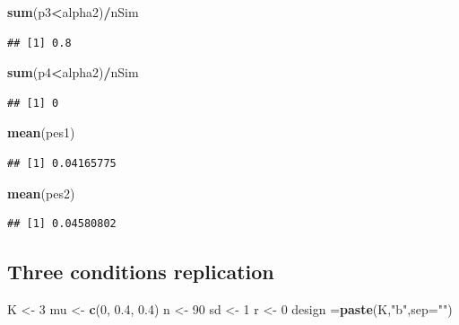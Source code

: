 \documentclass[]{book}
\newenvironment{Shaded}{\begin{snugshade}}{\end{snugshade}}
\newcommand{\DataTypeTok}[1]{\textcolor[rgb]{0.13,0.29,0.53}{#1}}
\newcommand{\DecValTok}[1]{\textcolor[rgb]{0.00,0.00,0.81}{#1}}
\newcommand{\FloatTok}[1]{\textcolor[rgb]{0.00,0.00,0.81}{#1}}
\newcommand{\KeywordTok}[1]{\textcolor[rgb]{0.13,0.29,0.53}{\textbf{#1}}}
\newcommand{\NormalTok}[1]{#1}
\newcommand{\OperatorTok}[1]{\textcolor[rgb]{0.81,0.36,0.00}{\textbf{#1}}}
\newcommand{\StringTok}[1]{\textcolor[rgb]{0.31,0.60,0.02}{#1}}
\begin{document}
\begin{Shaded}
\begin{Highlighting}[]
\KeywordTok{sum}\NormalTok{(p3}\OperatorTok{<}\NormalTok{alpha2)}\OperatorTok{/}\NormalTok{nSim}
\end{Highlighting}
\end{Shaded}

\begin{verbatim}
## [1] 0.8
\end{verbatim}

\begin{Shaded}
\begin{Highlighting}[]
\KeywordTok{sum}\NormalTok{(p4}\OperatorTok{<}\NormalTok{alpha2)}\OperatorTok{/}\NormalTok{nSim}
\end{Highlighting}
\end{Shaded}

\begin{verbatim}
## [1] 0
\end{verbatim}

\begin{Shaded}
\begin{Highlighting}[]
\KeywordTok{mean}\NormalTok{(pes1)}
\end{Highlighting}
\end{Shaded}

\begin{verbatim}
## [1] 0.04165775
\end{verbatim}

\begin{Shaded}
\begin{Highlighting}[]
\KeywordTok{mean}\NormalTok{(pes2)}
\end{Highlighting}
\end{Shaded}

\begin{verbatim}
## [1] 0.04580802
\end{verbatim}

\hypertarget{three-conditions-replication}{%
\subsection{Three conditions replication}\label{three-conditions-replication}}

\begin{Shaded}
\begin{Highlighting}[]
\NormalTok{K <-}\StringTok{ }\DecValTok{3}
\NormalTok{mu <-}\StringTok{ }\KeywordTok{c}\NormalTok{(}\DecValTok{0}\NormalTok{, }\FloatTok{0.4}\NormalTok{, }\FloatTok{0.4}\NormalTok{)}
\NormalTok{n <-}\StringTok{ }\DecValTok{90}
\NormalTok{sd <-}\StringTok{ }\DecValTok{1}
\NormalTok{r <-}\StringTok{ }\DecValTok{0}
\NormalTok{design =}\KeywordTok{paste}\NormalTok{(K,}\StringTok{"b"}\NormalTok{,}\DataTypeTok{sep=}\StringTok{""}\NormalTok{)}
\end{Highlighting}
\end{Shaded}
\end{document}
